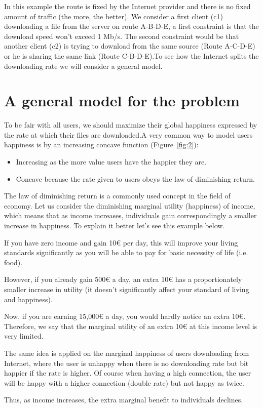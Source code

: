 In this example the route is fixed by the Internet provider and there is no fixed amount of traffic (the more, the better). We consider a first client (c1) downloading a file from the server on route A-B-D-E, a first constraint is that the download speed won't exceed 1 Mb/s. The second constraint would be that another client (c2) is trying to download from the same source (Route A-C-D-E) or he is sharing the same link (Route C-B-D-E).To see how the Internet splits the downloading rate we will consider a general model.

\section{A general model for the problem}

To be fair with all users, we should maximize their global happiness expressed by the rate at which their files are downloaded.A very common way to model users happiness is by an increasing concave function (Figure~\ref{fig:2}):
\begin{itemize}
	\item Increasing as the more value users have the happier they are.
	\item Concave because the rate given to users obeys the law of diminishing return.
\end{itemize}

\begin{remark}
	The law of diminishing return is a commonly used concept in the field of economy. Let us consider the diminishing marginal utility (happiness) of income, which means that as income increases, individuals gain correspondingly a smaller increase in happiness. To explain it better let's see this example below.
	
	If you have zero income and gain 10€ per day, this will improve your living standards significantly as you will be able to pay for basic necessity of life (i.e. food). 
	
	However, if you already gain 500€ a day, an extra 10€ has a proportionately smaller increase in utility (it doesn’t significantly affect your standard of living and happiness).
	
	Now, if you are earning 15,000€ a day, you would hardly notice an extra 10€. Therefore, we say that the marginal utility of an extra 10€ at this income level is very limited.
	
	The same idea is applied on the marginal happiness of users downloading from Internet, where the user is unhappy when there is no downloading rate but bit happier if the rate is higher. Of course when having a high connection, the user will be happy with a higher connection (double rate) but not happy as twice.
	
	Thus, as income increases, the extra marginal benefit to individuals declines.

\end{remark}

